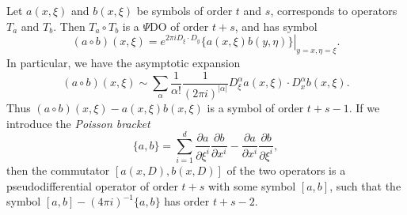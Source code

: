 \begin{theorem}
    Let $a(x,\xi)$ and $b(x,\xi)$ be symbols of order $t$ and $s$, corresponds to operators $T_a$ and $T_b$. Then $T_a \circ T_b$ is a $\Psi$DO of order $t + s$, and has symbol
    \[ (a \circ b)(x, \xi) = \left. e^{2 \pi i D_\xi \cdot D_y} \{ a(x,\xi) b(y,\eta) \} \right|_{y = x, \eta = \xi}. \]
    In particular, we have the asymptotic expansion
    \[ (a \circ b)(x,\xi) \sim \sum_\alpha \frac{1}{\alpha!} \frac{1}{(2 \pi i)^{|\alpha|}} D^\alpha_\xi a(x,\xi) \cdot D^\alpha_x b(x,\xi). \]
    Thus $(a \circ b)(x,\xi) - a(x,\xi) b(x,\xi)$ is a symbol of order $t + s - 1$. If we introduce the \emph{Poisson bracket}
    \[ \{ a, b \} = \sum_{i = 1}^d \frac{\partial a}{\partial \xi^i} \frac{\partial b}{\partial x^i} - \frac{\partial a}{\partial x^i} \frac{\partial b}{\partial \xi^i}, \]
    then the commutator $[a(x,D), b(x,D)]$ of the two operators is a pseudodifferential operator of order $t + s$ with some symbol $[a,b]$, such that the symbol $[a,b] - (4 \pi i)^{-1} \{ a, b \}$ has order $t + s - 2$.
\end{theorem}
